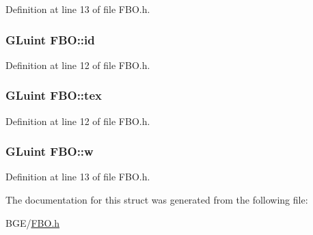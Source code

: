 Definition at line 13 of file F\-B\-O.\-h.

\hypertarget{struct_f_b_o_ab7aa75fe72b55be89b7307d81fc67948}{
\subsubsection[{id}]{\setlength{\rightskip}{0pt plus 5cm}G\-Luint F\-B\-O\-::id}}\label{struct_f_b_o_ab7aa75fe72b55be89b7307d81fc67948}


Definition at line 12 of file F\-B\-O.\-h.

\hypertarget{struct_f_b_o_aab7ef65db84f895bcc55033dcab8ce47}{
\subsubsection[{tex}]{\setlength{\rightskip}{0pt plus 5cm}G\-Luint F\-B\-O\-::tex}}\label{struct_f_b_o_aab7ef65db84f895bcc55033dcab8ce47}


Definition at line 12 of file F\-B\-O.\-h.

\hypertarget{struct_f_b_o_a49e0b8cf91b4177c5e9e2868dd492a09}{
\subsubsection[{w}]{\setlength{\rightskip}{0pt plus 5cm}G\-Luint F\-B\-O\-::w}}\label{struct_f_b_o_a49e0b8cf91b4177c5e9e2868dd492a09}


Definition at line 13 of file F\-B\-O.\-h.



The documentation for this struct was generated from the following file\-:\begin{DoxyCompactItemize}
\item 
B\-G\-E/\hyperlink{_f_b_o_8h}{F\-B\-O.\-h}\end{DoxyCompactItemize}
